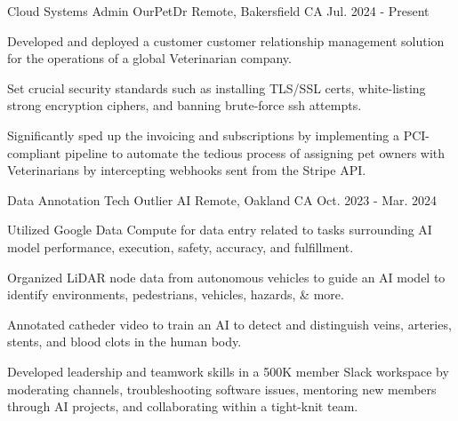 
\begin{cventries}

  \cventry
    {Cloud Systems Admin} %
    {OurPetDr} %
    {Remote, Bakersfield CA} %
    {Jul. 2024 - Present} %
    {
      \begin{cvitems} %
		  \item {Developed and deployed a customer customer relationship management solution for the operations of a global Veterinarian company.}
		  \item {Set crucial security standards such as installing TLS/SSL certs, white-listing strong encryption ciphers, and banning brute-force ssh attempts.}
		  \item {Significantly sped up the invoicing and subscriptions by implementing a PCI-compliant pipeline to automate the tedious process of assigning pet owners with Veterinarians by intercepting webhooks sent from the Stripe API.}
      \end{cvitems}
    }

  \cventry
    {Data Annotation Tech} %
    {Outlier AI} %
    {Remote, Oakland CA} %
    {Oct. 2023 - Mar. 2024} %
    {
      \begin{cvitems} %
		  \item {Utilized Google Data Compute for data entry related to tasks surrounding AI model performance, execution, safety, accuracy, and fulfillment.}
		  \item {Organized LiDAR node data from autonomous vehicles to guide an AI model to identify environments, pedestrians, vehicles, hazards, \& more.}
		  \item {Annotated catheder video to train an AI to detect and distinguish veins, arteries, stents, and blood clots in the human body.}
		  \item {Developed leadership and teamwork skills in a 500K member Slack workspace by moderating channels, troubleshooting software issues, mentoring new members through AI projects, and collaborating within a tight-knit team.}
      \end{cvitems}
    }


\end{cventries}
